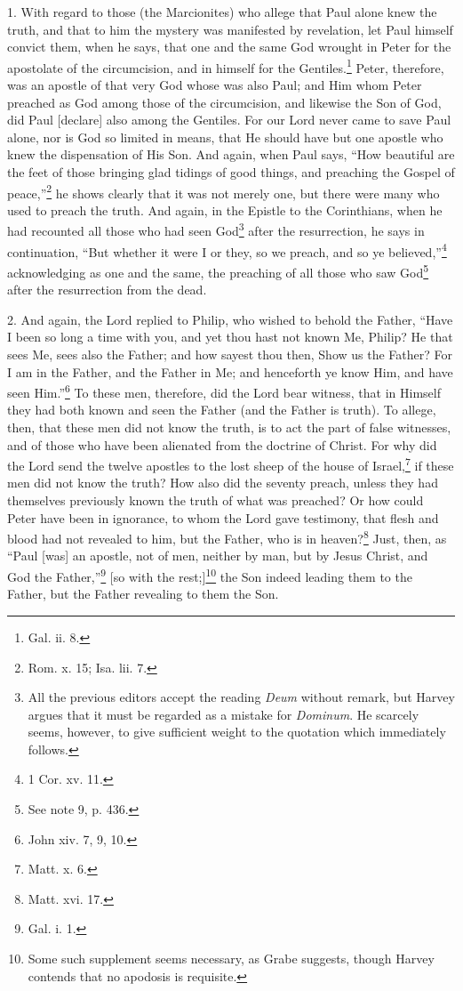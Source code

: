 
1. With regard to those (the Marcionites) who allege that Paul alone knew the truth, and that to him the mystery was manifested by revelation, let Paul himself convict them, when he says, that one and the same God wrought in Peter for the apostolate of the circumcision, and in himself for the Gentiles.\footnote{Gal. ii. 8.} Peter, therefore, was an apostle of that very God whose was also Paul; and Him whom Peter preached as God among those of the circumcision, and likewise the Son of God, did Paul [declare] also among the Gentiles. For our Lord never came to save Paul alone, nor is God so limited in means, that He should have but one apostle who knew the dispensation of His Son. And again, when Paul says, “How beautiful are the feet of those bringing glad tidings of good things, and preaching the Gospel of peace,”\footnote{Rom. x. 15; Isa. lii. 7.} he shows clearly that it was not merely one, but there were many who used to preach the truth. And again, in the Epistle to the Corinthians, when he had recounted all those who had seen God\footnote{All the previous editors accept the reading \emph{Deum} without remark, but Harvey argues that it must be regarded as a mistake for \emph{Dominum}. He scarcely seems, however, to give sufficient weight to the quotation which immediately follows.} after the resurrection, he  says in continuation, “But whether it were I or they, so we preach, and so ye believed,”\footnote{1 Cor. xv. 11.} acknowledging as one and the same, the preaching of all those who saw God\footnote{See note 9, p. 436.} after the resurrection from the dead.

2. And again, the Lord replied to Philip, who wished to behold the Father, “Have I been so long a time with you, and yet thou hast not known Me, Philip? He that sees Me, sees also the Father; and how sayest thou then, Show us the Father? For I am in the Father, and the Father in Me; and henceforth ye know Him, and have seen Him.”\footnote{John xiv. 7, 9, 10.} To these men, therefore, did the Lord bear witness, that in Himself they had both known and seen the Father (and the Father is truth). To allege, then, that these men did not know the truth, is to act the part of false witnesses, and of those who have been alienated from the doctrine of Christ. For why did the Lord send the twelve apostles to the lost sheep of the house of Israel,\footnote{Matt. x. 6.} if these men did not know the truth? How also did the seventy preach, unless they had themselves previously known the truth of what was preached? Or how could Peter have been in ignorance, to whom the Lord gave testimony, that flesh and blood had not revealed to him, but the Father, who is in heaven?\footnote{Matt. xvi. 17.} Just, then, as “Paul [was] an apostle, not of men, neither by man, but by Jesus Christ, and God the Father,”\footnote{Gal. i. 1.} [so with the rest;]\footnote{Some such supplement seems necessary, as Grabe suggests, though Harvey contends that no apodosis is requisite.} the Son indeed leading them to the Father, but the Father revealing to them the Son.

